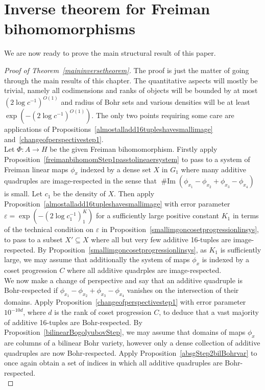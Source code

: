 \documentclass[a4paper,11pt]{article}
\numberwithin{theorem}{section}
\theoremstyle{definition}
\newcommand{\on}[1]{
	\operatorname{#1}
}
\newcommand\range{\on{\# Im}}
\begin{document}
\section{Inverse theorem for Freiman bihomomorphisms}\label{putevtogsection}

We are now ready to prove the main structural result of this paper.

\begin{proof}[Proof of Theorem~\ref{maininversetheorem}]
    The proof is just the matter of going through the main results of this chapter. The quantitative aspects will mostly be trivial, namely all codimensions and ranks of objects will be bounded by at most $(2\log c^{-1})^{O(1)}$ and radius of Bohr sets and various densities will be at least $\exp(-(2\log c^{-1})^{O(1)})$. The only two points requiring some care are applications of Propositions~\ref{almostalladd16tupleshavesmallimage} and~\ref{changeofperspectivestep1}.\\
    
    Let $\Phi : A \to H$ be the given Freiman bihomomorphism. Firstly apply Proposition~\ref{freimanbihomomStep1passtolineaersystem} to pass to a system of Freiman linear maps $\phi_x$ indexed by a dense set $X$ in $G_1$ where many additive quadruples are image-respected in the sense that $\range(\phi_{x_1} - \phi_{x_2} + \phi_{x_3} - \phi_{x_4})$ is small. Let $c_1$ be the density of $X$. Then apply Proposition~\ref{almostalladd16tupleshavesmallimage} with error parameter $\varepsilon = \exp (-(2\log c_1^{-1})^K_1)$ for a sufficiently large positive constant $K_1$ in terms of the technical condition on $\varepsilon$ in Proposition~\ref{smallimgoncosetprogressionlinsys}, to pass to a subset $X' \subseteq X$ where all but very few additive 16-tuples are image-respected. By Proposition~\ref{smallimgoncosetprogressionlinsys}, as $K_1$ is sufficiently large, we may assume that additionally the system of maps $\phi_x$ is indexed by a coset progression $C$ where all additive quadrples are image-respected.\\

    We now make a change of perspective and say that an additive quadruple is Bohr-respected if $\phi_{x_1} - \phi_{x_2} + \phi_{x_3} - \phi_{x_4}$ vanishes on the intersection of their domains.  Apply Proposition~\ref{changeofperspectivestep1} with error parameter $10^{-10d}$, where $d$ is the rank of coset progression $C$, to deduce that a vast majority of additive 16-tuples are Bohr-respected. By Proposition~\ref{bilinearBogolyubovStep}, we may assume that domains of maps $\phi_x$ are columns of a bilinear Bohr variety, however only a dense collection of additive quadruples are now Bohr-respected. Apply Proposition~\ref{absgStep2bilBohrvar} to once again obtain a set of indices in which all additive quadruples are Bohr-respected.\\


\end{proof}
\end{document}
